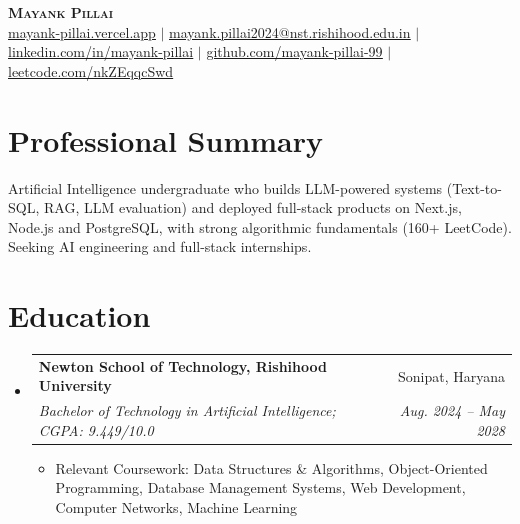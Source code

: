 \documentclass[letterpaper,11pt]{article}
\makeatletter
\newcommand{\resumeItem}[1]{
  \item\small{
    {#1 \vspace{-2pt}}
  }
}
\newcommand{\resumeSubheading}[4]{
  \vspace{-1pt}\item
    \begin{tabular*}{0.97\textwidth}[t]{l@{\extracolsep{\fill}}r}
      \textbf{#1} & #2 \\
      \textit{\small#3} & \textit{\small #4} \\
    \end{tabular*}\vspace{-5pt}
}
\newcommand{\resumeSubHeadingListStart}{\begin{itemize}[leftmargin=0.15in, label={}]}
\newcommand{\resumeSubHeadingListEnd}{\end{itemize}}
\newcommand{\resumeItemListStart}{\begin{itemize}}
\newcommand{\resumeItemListEnd}{\end{itemize}\vspace{-5pt}}
\makeatother
\begin{document}
\begin{center}
    \textbf{\Huge \scshape Mayank Pillai} \\ \vspace{4pt}
    \small \href{https://mayank-pillai.vercel.app}{\underline{mayank-pillai.vercel.app}} $|$
    \href{mailto:mayank.pillai2024@nst.rishihood.edu.in}{\underline{mayank.pillai2024@nst.rishihood.edu.in}} $|$ \\
    \href{https://www.linkedin.com/in/mayank-pillai-56798a30b/}{\underline{linkedin.com/in/mayank-pillai}} $|$
    \href{https://github.com/mayank-pillai-99}{\underline{github.com/mayank-pillai-99}} $|$
    \href{https://leetcode.com/u/nkZEqqcSwd/}{\underline{leetcode.com/nkZEqqcSwd}}
\end{center}

\section{Professional Summary}
\begin{itemize}[leftmargin=0.15in, label={}]
    \small{\item{
    Artificial Intelligence undergraduate who builds LLM-powered systems (Text-to-SQL, RAG, LLM evaluation) and deployed full-stack products on Next.js, Node.js and PostgreSQL, with strong algorithmic fundamentals (160+ LeetCode). Seeking AI engineering and full-stack internships.
    }}
\end{itemize}

\section{Education}
  \resumeSubHeadingListStart
    \resumeSubheading
      {Newton School of Technology, Rishihood University}{Sonipat, Haryana}
      {Bachelor of Technology in Artificial Intelligence; CGPA: 9.449/10.0}{Aug. 2024 -- May 2028}
      \resumeItemListStart
        \resumeItem{Relevant Coursework: Data Structures \& Algorithms, Object-Oriented Programming, Database Management
            Systems, Web Development, Computer Networks, Machine Learning}
      \resumeItemListEnd
  \resumeSubHeadingListEnd

\end{document}
